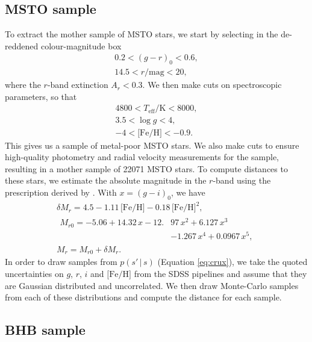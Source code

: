 \documentclass[useAMS,twocolumn,usenatbib]{mn2e}
\begin{document}
\subsection{MSTO sample}

To extract the mother sample of MSTO stars, we start by selecting in the de-reddened colour-magnitude box
%
\begin{gather}
0.2 < (g-r)_0 < 0.6, \nonumber \\
14.5 < r/\mathrm{mag} < 20,
\end{gather}
%
where the $r$-band extinction $A_r<0.3$. We then make cuts on spectroscopic parameters, so that
%
\begin{gather}
4800 < T_{\mathrm{eff}}/\mathrm{K} < 8000, \nonumber \\
3.5 < \log g < 4, \nonumber \\
-4 < \mathrm{\lbrack Fe/H \rbrack} < -0.9.
\end{gather}
% 
This gives us a sample of metal-poor MSTO stars. 
We also make cuts to ensure high-quality photometry and radial velocity measurements for the sample, resulting in a mother sample of 22071 MSTO stars. 
To compute distances to these stars, we estimate the absolute magnitude in the $r$-band using the prescription derived by \cite{Iv08}. 
With $x=(g-i)_0$, we have
%
\begin{gather}
\delta M_r = 4.5 - 1.11\,\lbrack \mathrm{Fe/H} \rbrack -0.18\,\lbrack \mathrm{Fe/H} \rbrack^2, \nonumber \\
\begin{split}
M_{r0} = -5.06 + 14.32\,x - 12.{}&97\,x^2 + 6.127\,x^3 \nonumber \\
                    {}&- 1.267\,x^4 + 0.0967\,x^5,
\end{split}\\
M_r = M_{r0} + \delta M_r.
\end{gather}
% 
In order to draw samples from $p(s' \,|\, s)$ (Equation \ref{eq:crux}), we take the quoted uncertainties on $g$, $r$, $i$ and $\lbrack \mathrm{Fe/H} \rbrack$ from the SDSS pipelines and assume that they are Gaussian distributed and uncorrelated. 
We then draw Monte-Carlo samples from each of these distributions and compute the distance for each sample.

\subsection{BHB sample}
\end{document}
